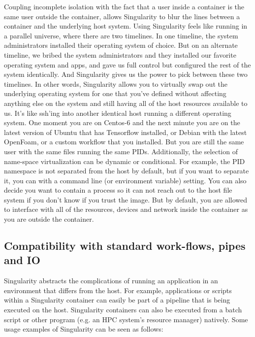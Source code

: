 \documentclass[letterpaper,10pt,english]{sphinxmanual}
\begin{document}
Coupling incomplete isolation with the fact that a user inside a
container is the same user outside the container, allows Singularity
to blur the lines between a container and the underlying host system.
Using Singularity feels like running in a parallel universe, where
there are two timelines. In one timeline, the system administrators
installed their operating system of choice. But on an alternate
timeline, we bribed the system administrators and they installed our
favorite operating system and apps, and gave us full control but
configured the rest of the system identically. And Singularity gives
us the power to pick between these two timelines.
In other words, Singularity allows you to virtually swap out the
underlying operating system for one that you’ve defined without
affecting anything else on the system and still having all of the host
resources available to us.
It’s like ssh’ing into another identical host running a different
operating system. One moment you are on Centos-6 and the next minute
you are on the latest version of Ubuntu that has Tensorflow installed,
or Debian with the latest OpenFoam, or a custom workflow that you
installed. But you are still the same user with the same files running
the same PIDs.
Additionally, the selection of name-space virtualization can be
dynamic or conditional. For example, the PID namespace is not
separated from the host by default, but if you want to separate it,
you can with a command line (or environment variable) setting. You can
also decide you want to contain a process so it can not reach out to
the host file system if you don’t know if you trust the image. But by
default, you are allowed to interface with all of the resources,
devices and network inside the container as you are outside the
container.


\subsection{Compatibility with standard work-flows, pipes and IO}
\label{\detokenize{introduction:compatibility-with-standard-work-flows-pipes-and-io}}
Singularity abstracts the complications of running an application in
an environment that differs from the host. For example, applications
or scripts within a Singularity container can easily be part of a
pipeline that is being executed on the host. Singularity containers
can also be executed from a batch script or other program (e.g. an HPC
system’s resource manager) natively.
Some usage examples of Singularity can be seen as follows:
\end{document}
